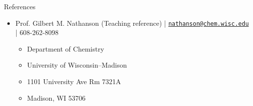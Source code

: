\documentclass{resume} %
\begin{document}
\begin{rSection}{References}
\begin{itemize}[leftmargin = 0 pt]
		\item Prof. Gilbert M. Nathanson (Teaching reference) | \href{mailto:nathanson@chem.wisc.edu}{\texttt{nathanson@chem.wisc.edu}} | 608-262-8098
		\begin{itemize}
			\item[] Department of Chemistry
			\item[] University of Wisconsin--Madison
			\item[] 1101 University Ave Rm 7321A
			\item[] Madison, WI 53706
		\end{itemize}
	\end{itemize}
\end{rSection}
\end{document}
